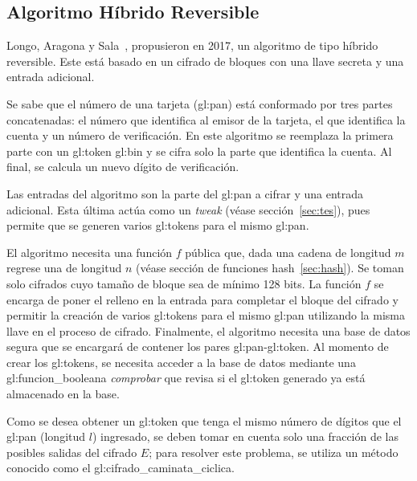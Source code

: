 %
%

\subsection{Algoritmo Híbrido Reversible}
\label{sec:ahr}
Longo, Aragona y Sala~\cite{aragona}, propusieron en 2017, un algoritmo
de tipo híbrido reversible. Este está basado en un cifrado de bloques con
una llave secreta y una entrada adicional.

Se sabe que el número de una tarjeta (\gls{gl:pan}) está conformado por
tres partes concatenadas: el número que identifica al emisor de la
tarjeta, el que identifica la cuenta y un número de verificación. En este
algoritmo se reemplaza la primera parte con un \gls{gl:token}
\gls{gl:bin} y se cifra solo la parte que identifica la cuenta. Al final,
se calcula un nuevo dígito de verificación.

Las entradas del algoritmo son la parte del \gls{gl:pan} a cifrar y una
entrada adicional. Esta última actúa como un \textit{tweak} (véase
sección~\ref{sec:tes}), pues permite que se generen varios
\glspl{gl:token} para el mismo \gls{gl:pan}.

El algoritmo necesita una función $f$ pública que, dada una cadena
de longitud $m$ regrese una de longitud $n$ (véase sección de funciones
hash~\ref{sec:hash}). Se toman solo cifrados cuyo tamaño de bloque sea de
mínimo 128 bits. La función $f$ se encarga de poner el relleno en la
entrada para completar el bloque del cifrado y permitir la creación de
varios \glspl{gl:token} para el mismo \gls{gl:pan} utilizando la misma
llave en el proceso de cifrado. Finalmente, el algoritmo necesita una
base de datos segura que se encargará de contener los pares
\gls{gl:pan}-\gls{gl:token}. Al momento de crear los \glspl{gl:token}, se
necesita acceder a la base de datos mediante una
\gls{gl:funcion_booleana} \textit{comprobar} que revisa si el
\gls{gl:token} generado ya está almacenado en la base.

Como se desea obtener un \gls{gl:token} que tenga el mismo número de
dígitos que el \gls{gl:pan} (longitud $l$) ingresado, se deben tomar en
cuenta solo una fracción de las posibles salidas del cifrado $E$; para
resolver este problema, se utiliza un método conocido como el
\gls{gl:cifrado_caminata_ciclica}.


